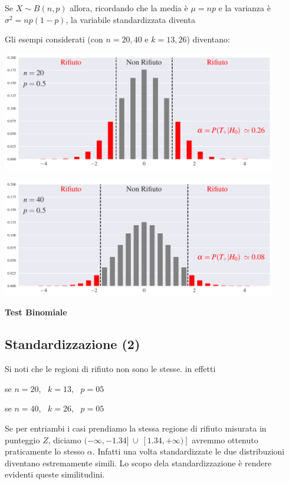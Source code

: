 \documentclass[12pt,openany]{book}
\theoremstyle{mio}
\theoremstyle{liscio}
\begin{document}
Se $X\sim B(n,p)$ allora, ricordando che la media è $\mu=np$ e la varianza è $\sigma^2=np(1-p)$, la variabile standardizzata diventa




Gli esempi considerati (con $n=20,40$ e $k=13,26$) diventano: 

\hfil\includegraphics[width=0.9\textwidth]{figure/B-test-standard_01.pdf}

\hfil\includegraphics[width=0.9\textwidth]{figure/B-test-standard_02.pdf}


\clearpage\hfill\textbf{Test Binomiale}
\subsection{Standardizzazione (2)}

Si noti che le regioni di rifiuto non sono le stesse. in effetti


\qquad se $n=20$, \ $k=13$, \ $p=05$


\qquad se $n=40$, \ $k=26$, \ $p=05$


Se per entriambi i casi prendiamo la stessa regione di rifiuto misurata in punteggio $Z$, diciamo $(-\infty, -1.34]\ \cup\ [1.34, +\infty)]$ avremmo ottenuto praticamente lo stesso $\alpha$. Infatti una volta standardizzate le due distribuzioni diventano estremamente simili. Lo scopo dela standardizzazione è rendere evidenti queste similitudini.  
\end{document}

